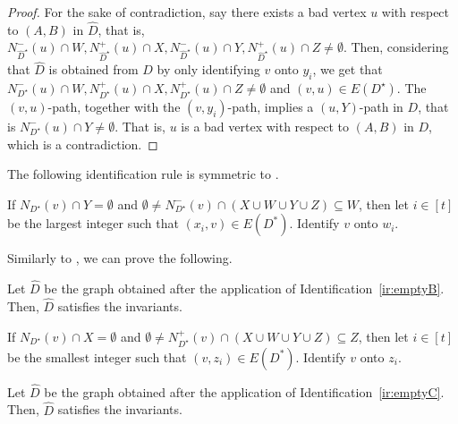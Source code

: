 \begin{proof}
 For the sake of contradiction, say there exists a bad vertex $u$ with respect to $(A,B)$ in $\widehat{D}$, that is, $N_{\widehat{D}^{\star}}^-(u) \cap W, N_{\widehat{D}^{\star}}^+(u) \cap X, N_{\widehat{D}^{\star}}^-(u) \cap Y, N_{\widehat{D}^{\star}}^+(u) \cap Z \neq \emptyset$. 
Then, considering that $\widehat{D}$ is obtained from $D$ by only identifying $v$ onto $y_i$, we get that
$N_{D^{\star}}^-(u) \cap W, N_{D^{\star}}^+(u) \cap X, N_{D^{\star}}^+(u) \cap Z \neq \emptyset$ and $(v,u) \in E(D^{\star})$.  The $(v,u)$-path, together with the $(v,y_i)$-path, implies a $(u,Y)$-path in $D$, that is $N_{D^{\star}}^-(u) \cap Y \neq \emptyset$. That is, $u$ is a bad vertex with respect to $(A,B)$ in $D$, which is a contradiction.
\end{proof}

The following identification rule is symmetric to .

\begin{identification rule}\label{ir:emptyB}
If $N_{D^{\star}}(v) \cap Y=\emptyset$ and $\emptyset \neq N_{D^{\star}}^-(v) \cap (X \cup W \cup Y \cup Z) \subseteq W$, then 
let $i \in [t]$ be the largest integer such that $(x_{i},v) \in E(D^*)$.
Identify $v$ onto $w_{i}$.
\end{identification rule}

Similarly to , we can prove the following.

\begin{lemma}\label{lem:iremptyB-safe}
Let $\widehat{D}$ be the graph obtained after the application of Identification~\ref{ir:emptyB}. Then, $\widehat{D}$ satisfies the invariants.
\end{lemma}

\begin{identification rule}\label{ir:emptyC}
If $N_{D^{\star}}(v) \cap X=\emptyset$ and $\emptyset \neq N_{D^{\star}}^+(v) \cap (X \cup W \cup Y \cup Z) \subseteq Z$, then 
let $i \in [t]$ be the smallest integer such that $(v,z_i) \in E(D^*)$.
Identify $v$ onto $z_{i}$.
\end{identification rule}

\begin{lemma}\label{lem:iremptyC-safe}
Let $\widehat{D}$ be the graph obtained after the application of Identification~\ref{ir:emptyC}. Then, $\widehat{D}$ satisfies the invariants.
\end{lemma}

